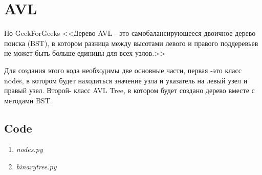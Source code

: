 
\section{AVL}

По GeekForGeeks\cite{geek} <<Дерево AVL - это самобалансирующееся двоичное
дерево поиска (BST), в котором разница между высотами левого и правого
поддеревьев не может быть больше единицы для всех узлов.>>

Для создания этого кода необходимы две основные части, первая -это класс nodes,
в котором будет находиться значение узла и указатель на левый узел и правый
узел. Второй- класс AVL Tree, в котором будет создано дерево вместе с
методами BST.

\subsection{Code}
\singlespace

\begin{enumerate}

  \item \textit{nodes.py}

  

  \item \textit{binarytree.py}

  


\end{enumerate}
